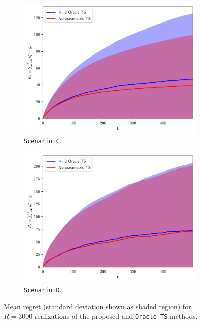 \begin{figure}[!h]
	\begin{subfigure}[c]{0.45\textwidth}
		\includegraphics[width=\textwidth]{./figs/linearGaussianMixture/unbalanced/cumregret_R3641.pdf}
		\vspace*{-5ex}
		\caption{\texttt{Scenario C}.}
		\label{fig:scenario_C_oracle}
	\end{subfigure}
	\begin{subfigure}[c]{0.45\textwidth}
		\includegraphics[width=\textwidth]{./figs/linearGaussianMixture/heavy/cumregret_R3250}
		\vspace*{-5ex}
		\caption{\texttt{Scenario D}.}
		\label{fig:scenario_D_oracle}
	\end{subfigure}
	\vspace*{-2ex}
	\caption{Mean regret (standard deviation shown as shaded region) for $R=3000$ realizations of the proposed and \texttt{Oracle TS} methods.}
	\label{fig:mixture_scenarios_oracle}
	\vspace*{-2ex}
\end{figure}

